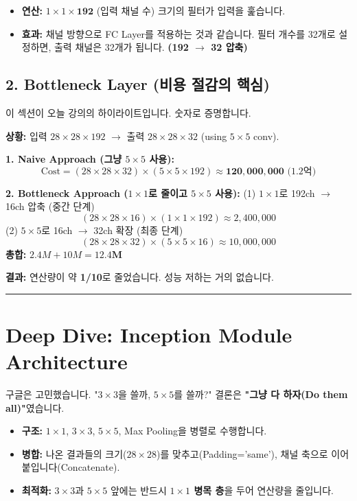 \documentclass[11pt,a4paper]{book}
\theoremstyle{definition}
\begin{document}
\begin{itemize}
    \item \textbf{연산:} $1 \times 1 \times \mathbf{192}$ (입력 채널 수) 크기의 필터가 입력을 훑습니다.
    \item \textbf{효과:} 채널 방향으로 FC Layer를 적용하는 것과 같습니다. 필터 개수를 32개로 설정하면, 출력 채널은 32개가 됩니다. \textbf{(192 $\to$ 32 압축)}
\end{itemize}

\subsection{2. Bottleneck Layer (비용 절감의 핵심)}
이 섹션이 오늘 강의의 하이라이트입니다. 숫자로 증명합니다.

\begin{mathbox}[title={Computational Cost Analysis}]
\textbf{상황:} 입력 $28 \times 28 \times 192$ $\to$ 출력 $28 \times 28 \times 32$ (using $5 \times 5$ conv).

\textbf{1. Naive Approach (그냥 $5 \times 5$ 사용):}
$$ \text{Cost} = (28 \times 28 \times 32) \times (5 \times 5 \times 192) \approx \mathbf{120,000,000} \text{ (1.2억)} $$

\textbf{2. Bottleneck Approach ($1 \times 1$로 줄이고 $5 \times 5$ 사용):}
(1) $1 \times 1$로 192ch $\to$ 16ch 압축 (중간 단계)
$$ (28 \times 28 \times 16) \times (1 \times 1 \times 192) \approx 2,400,000 $$
(2) $5 \times 5$로 16ch $\to$ 32ch 확장 (최종 단계)
$$ (28 \times 28 \times 32) \times (5 \times 5 \times 16) \approx 10,000,000 $$
\textbf{총합:} $2.4M + 10M = \mathbf{12.4M}$

\textbf{결과:} 연산량이 약 \textbf{1/10}로 줄었습니다. 성능 저하는 거의 없습니다.
\end{mathbox}

\vspace{0.5cm}\hrule\vspace{0.5cm}

\section{Deep Dive: Inception Module Architecture}

구글은 고민했습니다. "$3 \times 3$을 쓸까, $5 \times 5$를 쓸까?"
결론은 \textbf{"그냥 다 하자(Do them all)"}였습니다.


\begin{itemize}
    \item \textbf{구조:} $1 \times 1$, $3 \times 3$, $5 \times 5$, Max Pooling을 병렬로 수행합니다.
    \item \textbf{병합:} 나온 결과들의 크기($28 \times 28$)를 맞추고(Padding='same'), 채널 축으로 이어 붙입니다(Concatenate).
    \item \textbf{최적화:} $3 \times 3$과 $5 \times 5$ 앞에는 반드시 \textbf{$1 \times 1$ 병목 층}을 두어 연산량을 줄입니다.
\end{itemize}
\end{document}
